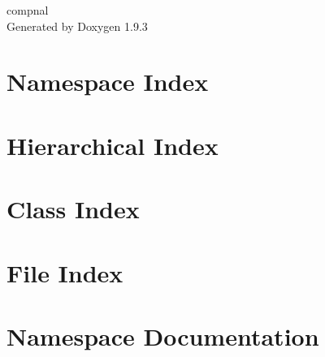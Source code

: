 \documentclass[twoside]{book}
\newcommand{\+}{\discretionary{\mbox{\scriptsize$\hookleftarrow$}}{}{}}
\newcommand{\clearemptydoublepage}{%
    \newpage{\pagestyle{empty}\cleardoublepage}%
  }
\begin{document}
  \raggedbottom
    \hypersetup{pageanchor=false,
                bookmarksnumbered=true,
                pdfencoding=unicode
               }
  \begin{titlepage}
  \vspace*{7cm}
  \begin{center}%
  {\Large compnal}\\
  \vspace*{1cm}
  {\large Generated by Doxygen 1.9.3}\\
  \end{center}
  \end{titlepage}
  \clearemptydoublepage
  \tableofcontents
  \clearemptydoublepage
  \hypersetup{pageanchor=true}
\chapter{Namespace Index}

\chapter{Hierarchical Index}

\chapter{Class Index}

\chapter{File Index}

\chapter{Namespace Documentation}






\end{document}
